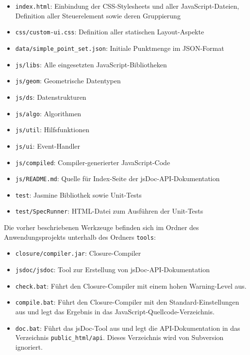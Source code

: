 \begin{itemize}
\item \verb+index.html+: Einbindung der CSS-Stylesheets und aller JavaScript-Dateien, Definition aller Steuerelement sowie deren Gruppierung
\item \verb+css/custom-ui.css+: Definition aller statischen Layout-Aspekte
\item \verb+data/simple_point_set.json+: Initiale Punkt\-menge im JSON-For\-mat
\item \verb+js/libs+: Alle eingesetzten JavaScript-Bibliotheken
\item \verb+js/geom+: Geometrische Datentypen
\item \verb+js/ds+: Datenstrukturen
\item \verb+js/algo+: Algorithmen
\item \verb+js/util+: Hilfsfunktionen
\item \verb+js/ui+: Event-Handler
\item \verb+js/compiled+: Compiler-generierter JavaScript-Code
\item \verb+js/README.md+: Quelle für Index-Seite der jsDoc-API-Dokumentation
\item \verb+test+: Jasmine Bibliothek sowie Unit-Tests
\item \verb+test/SpecRunner+: HTML-Datei zum Ausführen der Unit-Tests
\end{itemize}

Die vorher beschriebenen Werkzeuge befinden sich im Ordner des Anwendungsprojekts unterhalb des Ordners \verb+tools+:

\begin{itemize}
\item \verb+closure/compiler.jar+: Closure-Compiler
\item \verb+jsdoc/jsdoc+: Tool zur Erstellung von jsDoc-API-Dokumentation
\item \verb+check.bat+: Führt den Closure-Compiler mit einem hohen Warning-Level aus.
\item \verb+compile.bat+: Führt den Closure-Compiler mit den Standard-Einstellungen aus und legt das Ergebnis in das JavaScript-Quellcode-Verzeichnis.
\item \verb+doc.bat+: Führt das jsDoc-Tool aus und legt die API-Dokumentation in das Verzeichnis \verb+public_html/api+. Dieses Verzeichnis wird von Subversion ignoriert.
\end{itemize}

